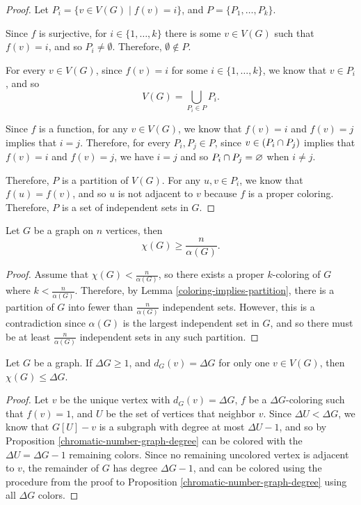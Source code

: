 \begin{proof}\proofbreak
    Let $P_i = \{v \in V(G) \mid f(v) = i\}$, and $P = \{P_1, \ldots, P_k\}$.

    Since $f$ is surjective, for $i \in \{1, \ldots, k\}$ there is some $v \in V(G)$ such that $f(v) = i$, and so $P_i \neq \emptyset$. Therefore, $\emptyset \notin P$.

    For every $v \in V(G)$, since $f(v) = i$ for some $i \in \{1, \ldots, k\}$, we know that $v \in P_i$, and so
    \[V(G) = \bigcup_{P_i\in P}P_i.\]

    Since $f$ is a function, for any $v \in V(G)$, we know that $f(v) = i$ and $f(v) = j$ implies that $i = j$. Therefore, for every $P_i, P_j \in P$, since $v \in (P_i \cap P_j)$ implies that $f(v) = i$ and $f(v) = j$, we have $i = j$ and so $P_i \cap P_j = \varnothing$ when $i \neq j$.

    Therefore, $P$ is a partition of $V(G)$. For any $u, v \in P_i$, we know that $f(u) = f(v)$, and so $u$ is not adjacent to $v$ because $f$ is a proper coloring. Therefore, $P$ is a set of independent sets in $G$.
\end{proof}

\begin{prop}
    Let $G$ be a graph on $n$ vertices, then
    \[\chi(G) \geq \frac{n}{\alpha(G)}.\]
\end{prop}

\begin{proof}
    Assume that $\chi(G) < \frac{n}{\alpha(G)}$, so there exists a proper $k$-coloring of $G$ where $k < \frac{n}{\alpha(G)}$. Therefore, by Lemma \ref{coloring-implies-partition}, there is a partition of $G$ into fewer than $\frac{n}{\alpha(G)}$ independent sets. However, this is a contradiction since $\alpha(G)$ is the largest independent set in $G$, and so there must be at least $\frac{n}{\alpha(G)}$ independent sets in any such partition.
\end{proof}

\begin{prop}\label{single-maximum-degree}
    Let $G$ be a graph. If $\Delta G \geq 1$, and $d_G(v) = \Delta G$ for only one $v \in V(G)$, then $\chi(G) \leq \Delta G$.
\end{prop}

\begin{proof}
    Let $v$ be the unique vertex with $d_G(v) = \Delta G$, $f$ be a $\Delta G$-coloring such that $f(v) = 1$, and $U$ be the set of vertices that neighbor $v$. Since $\Delta U < \Delta G$, we know that $G[U] - v$ is a subgraph with degree at most $\Delta U - 1$, and so by Proposition \ref{chromatic-number-graph-degree} can be colored with the $\Delta U = \Delta G - 1$ remaining colors. Since no remaining uncolored vertex is adjacent to $v$, the remainder of $G$ has degree $\Delta G - 1$, and can be colored using the procedure from the proof to Proposition \ref{chromatic-number-graph-degree} using all $\Delta G$ colors.
\end{proof}

